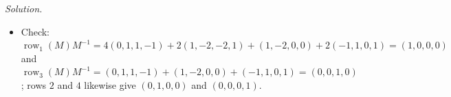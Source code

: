 \documentclass[12pt]{article}
\DeclareMathOperator{\row}{row}
\theoremstyle{definition}
\newenvironment{solution}{\par\noindent\textit{Solution.}\ }{\par\smallskip}
\begin{document}
\begin{solution}
\begin{itemize}
Theorem~\ref{r5b-thm-partitioned-inverse}(b)
\[
M^{-1}=\begin{pmatrix}F^{-1}&-F^{-1}BD^{-1}\\-D^{-1}CF^{-1}&D^{-1}+D^{-1}CF^{-1}BD^{-1}\end{pmatrix}
=\left(\begin{array}{cc|cc}0&1&1&-1\\1&-2&-2&1\\\hline1&-2&0&0\\-1&1&0&1\end{array}\right)
\]
\item Check: \(\row_1(M)M^{-1}=4(0,1,1,-1)+2(1,-2,-2,1)+(1,-2,0,0)+2(-1,1,0,1)=(1,0,0,0)\) and
\(\row_3(M)M^{-1}=(0,1,1,-1)+(1,-2,0,0)+(-1,1,0,1)=(0,0,1,0)\); rows \(2\) and \(4\) likewise give \((0,1,0,0)\) and
\((0,0,0,1)\).
\end{itemize}
\end{solution}
\end{document}
